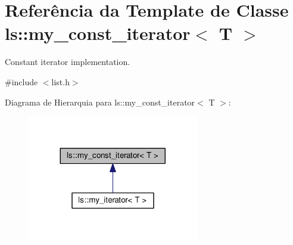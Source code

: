 \hypertarget{classls_1_1my__const__iterator}{}\section{Referência da Template de Classe ls\+:\+:my\+\_\+const\+\_\+iterator$<$ T $>$}
\label{classls_1_1my__const__iterator}


Constant iterator implementation.  




{\ttfamily \#include $<$list.\+h$>$}



Diagrama de Hierarquia para ls\+:\+:my\+\_\+const\+\_\+iterator$<$ T $>$\+:\nopagebreak
\begin{figure}[H]
\begin{center}
\leavevmode
\includegraphics[width=212pt]{classls_1_1my__const__iterator__inherit__graph}
\end{center}
\end{figure}

